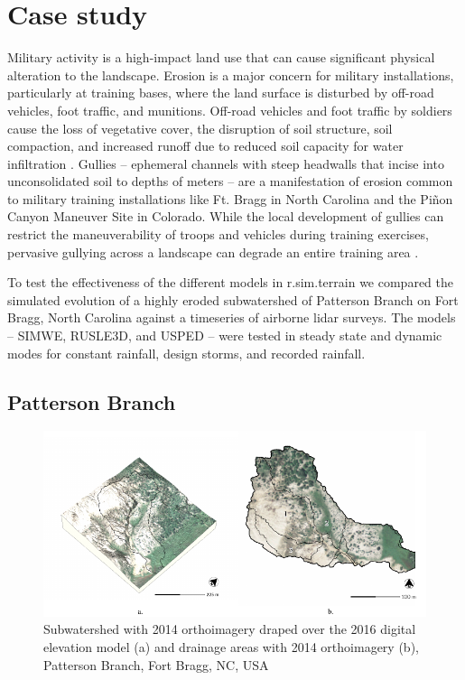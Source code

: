\documentclass[gmd, manuscript]{copernicus}
\begin{document}
\section{Case study} 

Military activity is a high-impact land use 
that can cause significant physical alteration to the landscape. 
Erosion is a major concern for military installations, 
particularly at training bases, 
where the land surface is disturbed by 
off-road vehicles, foot traffic, and munitions. 
Off-road vehicles and foot traffic by soldiers 
cause the loss of vegetative cover, 
the disruption of soil structure, soil compaction, 
and increased runoff due to 
reduced soil capacity for water infiltration 
\citep{Webb1983, McDonald2004}.
Gullies -- ephemeral channels with steep headwalls 
that incise into unconsolidated soil to depths of meters -- 
are a manifestation of erosion common to 
military training installations like Ft. Bragg in North Carolina 
and the Piñon Canyon Maneuver Site in Colorado. 
While the local development of gullies can restrict 
the maneuverability of troops and vehicles during training exercises, 
pervasive gullying across a landscape 
can degrade an entire training area 
\citep{Huang2014}.

To test the effectiveness of the different models 
in r.sim.terrain
we compared the simulated evolution
of a highly eroded subwatershed of 
Patterson Branch on Fort Bragg, North Carolina
against a timeseries of airborne lidar surveys.
The models -- SIMWE, RUSLE3D, and USPED --
were tested in steady state and dynamic modes
for constant rainfall, design storms, and recorded rainfall.

\subsection{Patterson Branch}

\begin{figure}
\center
\includegraphics[width=\textwidth,height=0.95\textheight,keepaspectratio]{figures/watershed.pdf}
\caption{Subwatershed with 2014 orthoimagery
draped over the 2016 digital elevation model (a)
and drainage areas with 2014 orthoimagery (b), Patterson Branch, Fort Bragg, NC, USA}
\label{fig:watershed}
\end{figure}
\end{document}
